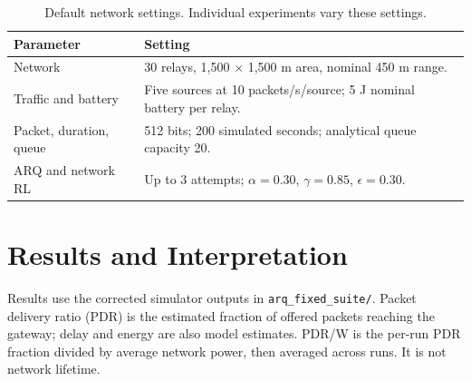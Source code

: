 \documentclass[11pt,a4paper]{article}
\begin{document}
\begin{table}[H]
\centering\small
\caption{Default network settings. Individual experiments vary these settings.}
\begin{tabularx}{\linewidth}{@{}lY@{}}\toprule
\textbf{Parameter} & \textbf{Setting}\\\midrule
Network & 30 relays, 1,500 $\times$ 1,500 m area, nominal 450 m range.\\
Traffic and battery & Five sources at 10 packets/s/source; 5 J nominal battery per relay.\\
Packet, duration, queue & 512 bits; 200 simulated seconds; analytical queue capacity 20.\\
ARQ and network RL & Up to 3 attempts; $\alpha=0.30$, $\gamma=0.85$, $\epsilon=0.30$.\\\bottomrule
\end{tabularx}
\end{table}

\section{Results and Interpretation}
Results use the corrected simulator outputs in \texttt{arq\_fixed\_suite/}. Packet delivery ratio (PDR) is the estimated fraction of offered packets reaching the gateway; delay and energy are also model estimates. PDR/W is the per-run PDR fraction divided by average network power, then averaged across runs. It is not network lifetime.
\end{document}
